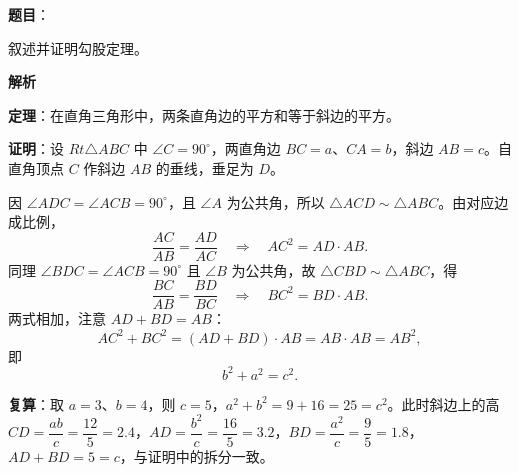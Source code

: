 \begin{answer}

\textbf{题目}：

叙述并证明勾股定理。

\textbf{解析}

\textbf{定理}：在直角三角形中，两条直角边的平方和等于斜边的平方。

\textbf{证明}：设 $Rt\triangle ABC$ 中 $\angle C=90^\circ$，两直角边 $BC=a$、$CA=b$，斜边 $AB=c$。自直角顶点 $C$ 作斜边 $AB$ 的垂线，垂足为 $D$。

因 $\angle ADC=\angle ACB=90^\circ$，且 $\angle A$ 为公共角，所以 $\triangle ACD\sim\triangle ABC$。由对应边成比例，
\nopagebreak[4]
\[
\frac{AC}{AB}=\frac{AD}{AC}\quad\Longrightarrow\quad AC^2=AD\cdot AB.
\]
同理 $\angle BDC=\angle ACB=90^\circ$ 且 $\angle B$ 为公共角，故 $\triangle CBD\sim\triangle ABC$，得
\nopagebreak[4]
\[
\frac{BC}{AB}=\frac{BD}{BC}\quad\Longrightarrow\quad BC^2=BD\cdot AB.
\]
两式相加，注意 $AD+BD=AB$：
\nopagebreak[4]
\[
AC^2+BC^2=(AD+BD)\cdot AB=AB\cdot AB=AB^2,
\]
即
\nopagebreak[4]
\[
b^2+a^2=c^2.
\]

\textbf{复算}：取 $a=3$、$b=4$，则 $c=5$，$a^2+b^2=9+16=25=c^2$。此时斜边上的高 $CD=\dfrac{ab}{c}=\dfrac{12}5=2.4$，$AD=\dfrac{b^2}{c}=\dfrac{16}{5}=3.2$，$BD=\dfrac{a^2}{c}=\dfrac95=1.8$，$AD+BD=5=c$，与证明中的拆分一致。


\end{answer}
